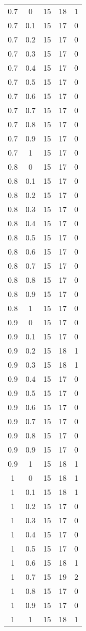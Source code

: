 \begin{longtable}{|c|c|c|c|c|}
	0.7& 0& 15& 18& 1 \\
	0.7& 0.1& 15& 17& 0 \\
	0.7& 0.2& 15& 17& 0 \\
	0.7& 0.3& 15& 17& 0 \\
	0.7& 0.4& 15& 17& 0 \\
	0.7& 0.5& 15& 17& 0 \\
	0.7& 0.6& 15& 17& 0 \\
	0.7& 0.7& 15& 17& 0 \\
	0.7& 0.8& 15& 17& 0 \\
	0.7& 0.9& 15& 17& 0 \\
	0.7& 1& 15& 17& 0 \\
	\hline
	
	0.8& 0& 15& 17& 0 \\
	0.8& 0.1& 15& 17& 0 \\
	0.8& 0.2& 15& 17& 0 \\
	0.8& 0.3& 15& 17& 0 \\
	0.8& 0.4& 15& 17& 0 \\
	0.8& 0.5& 15& 17& 0 \\
	0.8& 0.6& 15& 17& 0 \\
	0.8& 0.7& 15& 17& 0 \\
	0.8& 0.8& 15& 17& 0 \\
	0.8& 0.9& 15& 17& 0 \\
	0.8& 1& 15& 17& 0 \\
	\hline
	
	0.9& 0& 15& 17& 0 \\
	0.9& 0.1& 15& 17& 0 \\
	0.9& 0.2& 15& 18& 1 \\
	0.9& 0.3& 15& 18& 1 \\
	0.9& 0.4& 15& 17& 0 \\
	0.9& 0.5& 15& 17& 0 \\
	0.9& 0.6& 15& 17& 0 \\
	0.9& 0.7& 15& 17& 0 \\
	0.9& 0.8& 15& 17& 0 \\
	0.9& 0.9& 15& 17& 0 \\
	0.9& 1& 15& 18& 1 \\
	\hline
	
	1& 0& 15& 18& 1 \\
	1& 0.1& 15& 18& 1 \\
	1& 0.2& 15& 17& 0 \\
	1& 0.3& 15& 17& 0 \\
	1& 0.4& 15& 17& 0 \\
	1& 0.5& 15& 17& 0 \\
	1& 0.6& 15& 18& 1 \\
	1& 0.7& 15& 19& 2 \\
	1& 0.8& 15& 17& 0 \\
	1& 0.9& 15& 17& 0 \\
	1& 1& 15& 18& 1 \\
	
\end{longtable}

